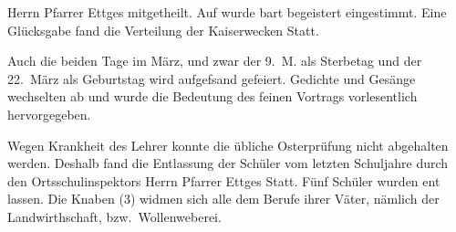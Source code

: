

Herrn Pfarrer Ettges mitgetheilt. Auf wurde\ob
bart begeistert eingestimmt. Eine Glücksgabe fand\ob
die Verteilung der Kaiserwecken Statt.

\pend
{}
\pstart

Auch die beiden Tage im März, und zwar der 9.\ M.\ob
als Sterbetag und der 22.\ März als Geburtstag wird\ob
aufgefsand gefeiert. Gedichte und Gesänge wechselten\ob
ab und wurde die Bedeutung des feinen Vortrags\ob
vorlesentlich hervorgegeben.

\pend
{}
\pstart

Wegen Krankheit des Lehrer konnte die übliche\ob
Osterprüfung nicht abgehalten werden. Deshalb\ob
fand die Entlassung der Schüler vom letzten\ob
Schuljahre durch den Ortsschulinspektors Herrn\ob
Pfarrer Ettges Statt. Fünf Schüler wurden ent\ohb
lassen. Die Knaben (3) widmen sich alle dem\ob
Berufe ihrer Väter, nämlich der Landwirthschaft,\ob
bzw.\ Wollenweberei.
\pend

